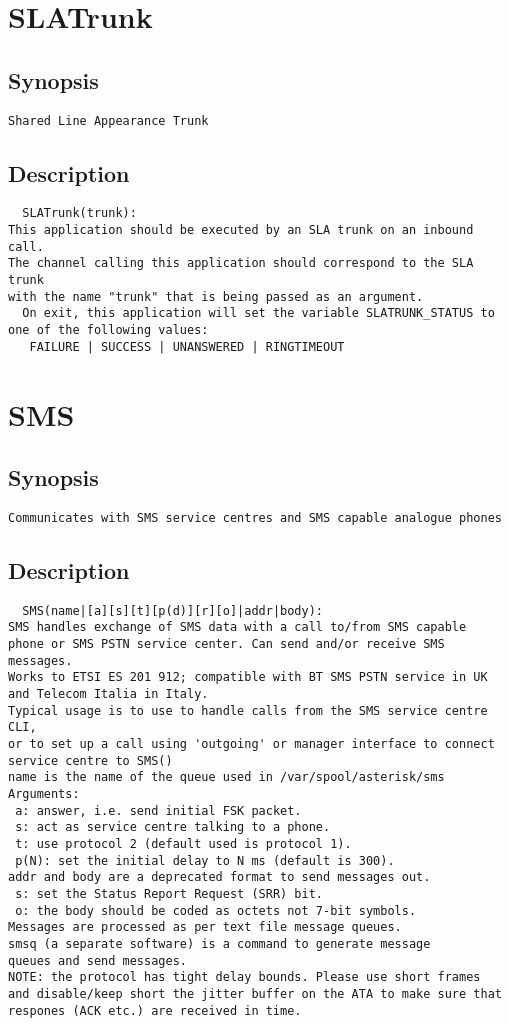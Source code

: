 \section{SLATrunk}
\subsection{Synopsis}
\begin{verbatim}
Shared Line Appearance Trunk
\end{verbatim}
\subsection{Description}
\begin{verbatim}
  SLATrunk(trunk):
This application should be executed by an SLA trunk on an inbound call.
The channel calling this application should correspond to the SLA trunk
with the name "trunk" that is being passed as an argument.
  On exit, this application will set the variable SLATRUNK_STATUS to
one of the following values:
   FAILURE | SUCCESS | UNANSWERED | RINGTIMEOUT

\end{verbatim}


\section{SMS}
\subsection{Synopsis}
\begin{verbatim}
Communicates with SMS service centres and SMS capable analogue phones
\end{verbatim}
\subsection{Description}
\begin{verbatim}
  SMS(name|[a][s][t][p(d)][r][o]|addr|body):
SMS handles exchange of SMS data with a call to/from SMS capable
phone or SMS PSTN service center. Can send and/or receive SMS messages.
Works to ETSI ES 201 912; compatible with BT SMS PSTN service in UK
and Telecom Italia in Italy.
Typical usage is to use to handle calls from the SMS service centre CLI,
or to set up a call using 'outgoing' or manager interface to connect
service centre to SMS()
name is the name of the queue used in /var/spool/asterisk/sms
Arguments:
 a: answer, i.e. send initial FSK packet.
 s: act as service centre talking to a phone.
 t: use protocol 2 (default used is protocol 1).
 p(N): set the initial delay to N ms (default is 300).
addr and body are a deprecated format to send messages out.
 s: set the Status Report Request (SRR) bit.
 o: the body should be coded as octets not 7-bit symbols.
Messages are processed as per text file message queues.
smsq (a separate software) is a command to generate message
queues and send messages.
NOTE: the protocol has tight delay bounds. Please use short frames
and disable/keep short the jitter buffer on the ATA to make sure that
respones (ACK etc.) are received in time.

\end{verbatim}


